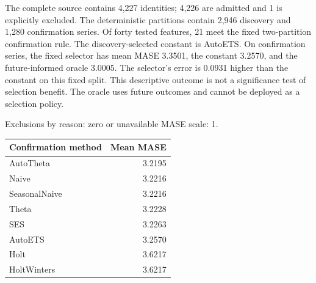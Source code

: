 The complete source contains 4,227 identities; 4,226 are admitted and 1 is explicitly excluded. The deterministic partitions contain 2,946 discovery and 1,280 confirmation series. Of forty tested features, 21 meet the fixed two-partition confirmation rule. The discovery-selected constant is AutoETS. On confirmation series, the fixed selector has mean MASE 3.3501, the constant 3.2570, and the future-informed oracle 3.0005. The selector's error is 0.0931 higher than the constant on this fixed split. This descriptive outcome is not a significance test of selection benefit. The oracle uses future outcomes and cannot be deployed as a selection policy.

Exclusions by reason: zero or unavailable MASE scale: 1.

\begin{center}\begin{tabular}{lr}
\toprule Confirmation method & Mean MASE\\\midrule
AutoTheta & 3.2195 \\
Naive & 3.2216 \\
SeasonalNaive & 3.2216 \\
Theta & 3.2228 \\
SES & 3.2263 \\
AutoETS & 3.2570 \\
Holt & 3.6217 \\
HoltWinters & 3.6217 \\
\bottomrule\end{tabular}\end{center}

